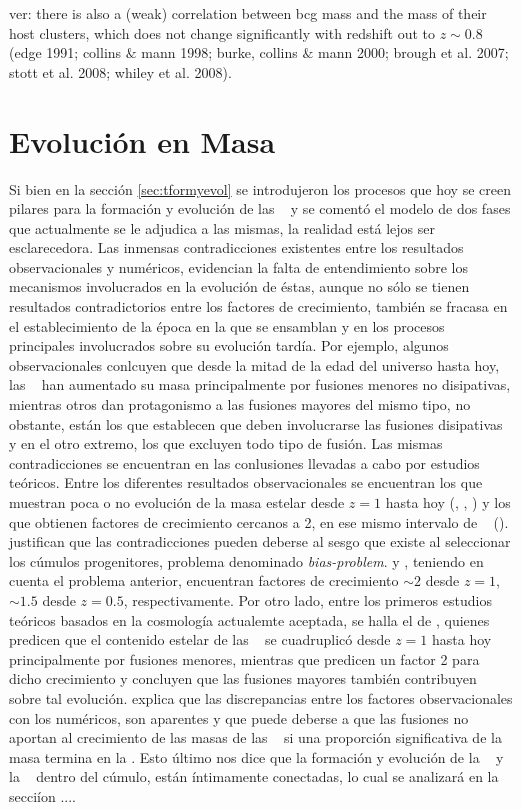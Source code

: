 ver: there is also a (weak) correlation between bcg mass and the mass of their host clusters, which does not change significantly
with redshift out to $z\sim 0.8$ (edge 1991; collins $\&$ mann 1998; burke, collins $\&$ mann 2000; brough et al. 2007; stott et al. 2008;
whiley et al. 2008).

\section{Evoluci\'on en Masa}
\label{sec:evolmasa}
Si bien en la secci\'on \ref{sec:tformyevol} se introdujeron
los procesos que hoy se creen pilares para la formaci\'on
y evoluci\'on de las \bcgs~ y 
se coment\'o el modelo de dos fases 
que actualmente se le adjudica a las mismas,
la realidad est\'a lejos ser esclarecedora. Las inmensas contradicciones
existentes entre los resultados observacionales y num\'ericos, evidencian
la falta de entendimiento sobre los mecanismos involucrados en la evoluci\'on
de \'estas, aunque no s\'olo se tienen resultados contradictorios entre los factores
de crecimiento, tambi\'en
se fracasa en el establecimiento de la \'epoca en la que se ensamblan y en los procesos
principales involucrados sobre su evoluci\'on tard\'ia. Por ejemplo, algunos observacionales conlcuyen que desde la mitad
de la edad del universo hasta hoy, las \bcgs~ han aumentado su masa principalmente por fusiones menores no disipativas, mientras
otros dan protagonismo a las fusiones mayores del mismo tipo, no obstante, est\'an los que establecen que deben involucrarse las 
fusiones disipativas y en el otro extremo, los que excluyen todo tipo de fusi\'on. Las mismas
contradicciones se encuentran en las conlusiones llevadas a cabo por estudios te\'oricos.
Entre los diferentes resultados observacionales se encuentran los que muestran poca o no evoluci\'on de la masa estelar
desde $z=1$ hasta hoy (\cite{whi08}, \cite{col09}, \cite{sto10})
y los que obtienen factores de crecimiento cercanos a 2, en ese mismo intervalo
de \z~ (\cite{ara98}). \cite{bur00} justifican que las contradicciones pueden 
deberse al sesgo que existe al seleccionar los c\'umulos progenitores, problema denominado \textit{bias-problem}.
\cite{lid12} y \cite{bai14}, teniendo en cuenta
el problema anterior, encuentran factores de crecimiento $\sim2$ desde $z=1$, $\sim1.5$ desde $z=0.5$, respectivamente.
Por otro lado, entre los primeros estudios te\'oricos
basados en la cosmolog\'ia actualemte aceptada,
se halla el de \cite{del07}, quienes predicen que el contenido estelar de las \bcgs~
se cuadruplic\'o desde $z=1$ hasta hoy principalmente por fusiones menores, mientras que
\cite{lap13} predicen un factor 2 para dicho crecimiento y concluyen que las fusiones
mayores tambi\'en contribuyen sobre tal evoluci\'on.
\cite{gro17} explica que las discrepancias entre los factores observacionales con los num\'ericos,
son aparentes y que puede deberse a que las fusiones no aportan al crecimiento
de las masas de las \bcgs~ si una proporci\'on significativa de la masa termina en la \icl.
Esto \'ultimo nos dice que la formaci\'on y evoluci\'on de la \bcg~ y la \icl~ dentro del c\'umulo,
est\'an \'intimamente conectadas, lo cual se analizar\'a en la secci\'ion ....


